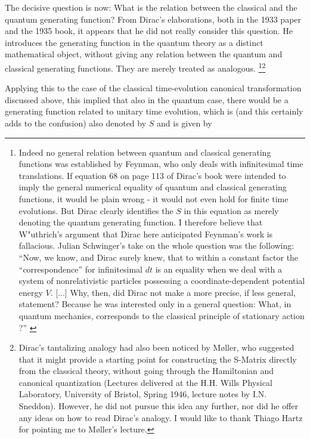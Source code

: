 \documentclass[12pt]{article}
\begin{document}
The decisive question is now: What is the relation between the classical and the quantum generating function? From Dirac's elaborations, both in the 1933 paper and the 1935 book, it appears that he did not really consider this question. He introduces the generating function in the quantum theory as a distinct mathematical object, without giving any relation between the quantum and classical generating functions. They are merely treated as analogous. \footnote{Indeed no general relation between quantum and classical generating functions was established by Feynman, who only deals with infinitesimal time translations. If equation 68 on page 113 of Dirac's book were intended to imply the general numerical equality of quantum and classical generating functions, it would be plain wrong - it would not even hold for finite time evolutions. But Dirac clearly identifies the $S$ in this equation as merely denoting the quantum generating function. I therefore believe that W"uthrich's argument that Dirac here anticipated Feynman's work \citep[p.53]{wuethrich_2010_the-genesis} is fallacious. Julian Schwinger's take on the whole question was the following: ``Now, we know, and Dirac surely knew, that to within a constant factor the ``correspondence'' for infinitesimal $dt$ is an equality when we deal with a system of nonrelativistic particles possessing a coordinate-dependent potential energy $V$. [...] Why, then, did Dirac not make a more precise, if less general, statement? Because he was interested only in a general question: What, in quantum mechanics, corresponds to the classical principle of stationary action ?'' \citep{schwinger_1989_a-path}}\footnote{Dirac's tantalizing analogy had also been noticed by M\o ller, who suggested that it might provide a starting point for constructing the S-Matrix directly from the classical theory, without going through the Hamiltonian and canonical quantization (Lectures delivered at the H.H. Wills Physical Laboratory, University of Bristol, Spring 1946, lecture notes by I.N. Sneddon). However, he did not pursue this idea any further, nor did he offer any ideas on how to read Dirac's analogy. I would like to thank Thiago Hartz for pointing me to M\o ller's lecture.}

Applying this to the case of the classical time-evolution canonical transformation discussed above, this implied that also in the quantum case, there would be a generating function related to unitary time evolution, which is (and this certainly adds to the confusion) also denoted by $S$ and is given by
\end{document}
